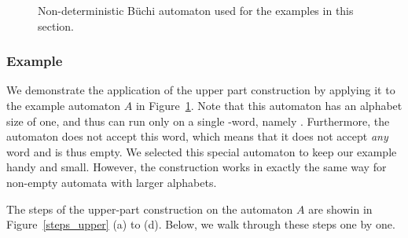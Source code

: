 \begin{figure}[htb]
\centering
\Automaton
\caption{Non-deterministic Büchi automaton used for the examples in this section.}
\label{ex_aut_2}
\end{figure}





\subsubsection{Example}
We demonstrate the application of the upper part construction by applying it to the example automaton $A$ in Figure~\ref{ex_aut_2}. Note that this automaton has an alphabet size of one, and thus can run only on a single \om-word, namely \aom. Furthermore, the automaton does not accept this word, which means that it does not accept \textit{any} word and is thus empty. We selected this special  automaton to keep our example handy and small. However, the construction works in exactly the same way for non-empty automata with larger alphabets.

The steps of the upper-part construction on the automaton $A$ are showin in Figure~\ref{steps_upper} (a) to (d). Below, we walk through these steps one by one.

